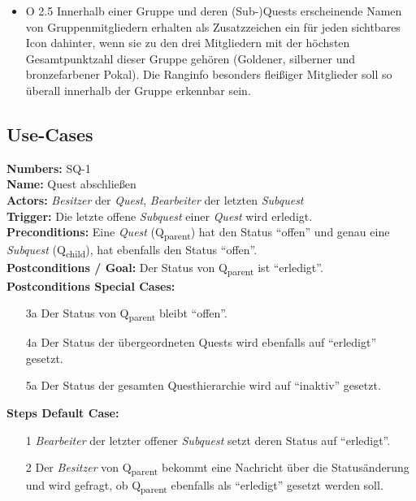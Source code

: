 \documentclass{article}
\begin{document}
\begin{itemize}
        \item{O 2.5} Innerhalb einer Gruppe und deren (Sub-)Quests erscheinende Namen von Gruppenmitgliedern erhalten als Zusatzzeichen ein für jeden sichtbares Icon dahinter, wenn sie zu den 	drei Mitgliedern mit der höchsten Gesamtpunktzahl dieser Gruppe gehören (Goldener, silberner und bronzefarbener Pokal). Die Ranginfo besonders fleißiger Mitglieder soll so überall 		innerhalb der Gruppe erkennbar sein.
	
    \end{itemize}

\subsection{Use-Cases}

\begin{samepage}
\textbf{Numbers:} SQ-1\\
\textbf{Name:} Quest abschließen\\
\textbf{Actors:} \textit{Besitzer} der \textit{Quest}, \textit{Bearbeiter} der letzten \textit{Subquest} \\
\textbf{Trigger:} Die letzte offene \textit{Subquest} einer \textit{Quest} wird erledigt.\\
\textbf{Preconditions:} Eine \textit{Quest} (Q\textsubscript{parent}) hat den Status ``offen'' und genau eine \textit{Subquest} (Q\textsubscript{child}), hat ebenfalls den Status ``offen''. \\
\textbf{Postconditions / Goal:} Der Status von Q\textsubscript{parent} ist ``erledigt''. \\
\textbf{Postconditions Special Cases:} 
\begin{itemize}
    \item[3a] Der Status von Q\textsubscript{parent} bleibt ``offen''. 
    \item[4a] Der Status der übergeordneten Quests wird ebenfalls auf ``erledigt'' gesetzt. 
    \item[5a] Der Status der gesamten Questhierarchie wird auf ``inaktiv'' gesetzt.
\end{itemize}
\textbf{Steps Default Case:}
\begin{itemize}
    \item[1] \textit{Bearbeiter} der letzter offener \textit{Subquest} setzt deren Status auf ``erledigt''.
    \item[2] Der \textit{Besitzer} von Q\textsubscript{parent} bekommt eine Nachricht über die Statusänderung und wird gefragt, ob Q\textsubscript{parent} ebenfalls  als ``erledigt'' gesetzt werden soll.

\end{itemize}
\end{samepage}
\end{document}
